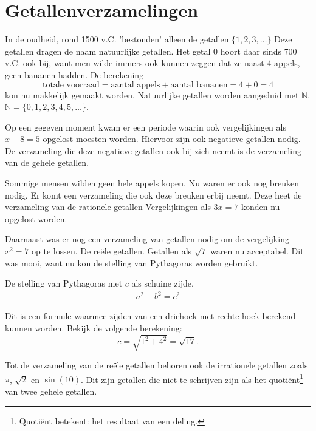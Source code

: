 \documentclass[11pt,fleqn]{book} %
\begin{document}
\section{Getallenverzamelingen}
In de oudheid, rond 1500 v.C. 'bestonden' alleen de getallen $\{1,2,3,\ldots\}$ Deze getallen dragen de naam natuurlijke getallen. Het getal 0 hoort daar sinds 700 v.C. ook bij, want men wilde immers ook kunnen zeggen dat ze naast 4 appels, geen bananen hadden. De berekening
\begin{displaymath}
\text{totale voorraad} = \text{aantal appels}+\text{aantal bananen}=4+0=4
\end{displaymath}
kon nu makkelijk gemaakt worden. Natuurlijke getallen worden aangeduid met $\mathbb{N}$. $\mathbb{N}=\{0,1,2,3,4,5,\ldots\}$.

Op een gegeven moment kwam er een periode waarin ook vergelijkingen als $x + 8 = 5$ opgelost moesten worden. Hiervoor zijn ook negatieve getallen nodig. De verzameling die deze negatieve getallen ook bij zich neemt is de verzameling van de gehele getallen.

Sommige mensen wilden geen hele appels kopen. Nu waren er ook nog breuken nodig. Er komt een verzameling die ook deze breuken erbij neemt. Deze heet de verzameling van de rationele getallen Vergelijkingen als $3x = 7$ konden nu opgelost worden.

Daarnaast was er nog een verzameling van getallen nodig om de vergelijking $x^2 = 7$ op te lossen. De reële getallen. Getallen als $\sqrt{7}$ waren nu acceptabel. Dit was mooi, want nu kon de stelling van Pythagoras worden gebruikt.
\begin{theorem}\label{eq:pyth}
De stelling van Pythagoras met $c$ als schuine zijde.
\begin{align}
a^2+b^2=c^2
\end{align}
\end{theorem}
Dit is een formule waarmee zijden van een driehoek met rechte hoek berekend kunnen worden. Bekijk de volgende berekening:
\begin{displaymath}
c=\sqrt{1^2+4^2}=\sqrt{17}.
\end{displaymath}

Tot de verzameling van de reële getallen behoren ook de irrationele getallen zoals $\pi$, $\sqrt{2}$ en $\sin{(10)}$. Dit zijn getallen die niet te schrijven zijn als het quotiënt\footnote{Quotiënt betekent: het resultaat van een deling.} van twee gehele getallen.
\end{document}
